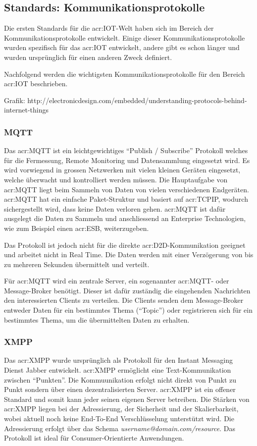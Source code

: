 \subsection{Standards: Kommunikationsprotokolle}
Die ersten Standards für die \gls{acr:IOT}-Welt haben sich im Bereich der Kommunikationsprotokolle entwickelt. Einige dieser Kommunikationsprotokolle wurden spezifisch für das \gls{acr:IOT} entwickelt, andere gibt es schon länger und wurden ursprünglich für einen anderen Zweck definiert.

Nachfolgend werden die wichtigsten Kommunikationsprotokolle für den Bereich \gls{acr:IOT} beschrieben.

Grafik: http://electronicdesign.com/embedded/understanding-protocols-behind-internet-things 


\subsubsection{MQTT}
Das \gls{acr:MQTT} ist ein leichtgewichtiges "`Publish / Subscribe"' Protokoll welches für die Fermessung, Remote Monitoring und Datensammlung eingesetzt wird. Es wird vorwiegend in grossen Netzwerken mit vielen kleinen Geräten eingesetzt, welche überwacht und kontrolliert werden müssen. Die Hauptaufgabe von \gls{acr:MQTT} liegt beim Sammeln von Daten von vielen verschiedenen Endgeräten. \gls{acr:MQTT} hat ein einfache Paket-Struktur und basiert auf \gls{acr:TCPIP}, wodurch sichergestellt wird, dass keine Daten verloren gehen. \gls{acr:MQTT} ist dafür ausgelegt die Daten zu Sammeln und anschliessend an Enterprise Technologien, wie zum Beispiel einen \gls{acr:ESB}, weiterzugeben.

Das Protokoll ist jedoch nicht für die direkte \gls{acr:D2D}-Kommunikation geeignet und arbeitet nicht in Real Time. Die Daten werden mit einer Verzögerung von bis zu mehreren Sekunden übermittelt und verteilt.

Für \gls{acr:MQTT} wird ein zentrale Server, ein sogenannter \gls{acr:MQTT}- oder Message-Broker benötigt. Dieser ist dafür zuständig die eingehenden Nachrichten den interessierten Clients zu verteilen. Die Clients senden dem Message-Broker entweder Daten für ein bestimmtes Thema ("`Topic"') oder registrieren sich für ein bestimmtes Thema, um die übermittelten Daten zu erhalten.



\subsubsection{XMPP}
Das \gls{acr:XMPP} wurde ursprünglich als Protokoll für den Instant Messaging Dienst Jabber entwickelt. \gls{acr:XMPP} ermöglicht eine Text-Kommunikation zwischen "`Punkten"'. Die Kommuunikation erfolgt nicht direkt von Punkt zu Punkt sondern über einen dezentralisierten Server. \gls{acr:XMPP} ist ein offener Standard und somit kann jeder seinen eigenen Server betreiben. Die Stärken von \gls{acr:XMPP} liegen bei der Adressierung, der Sicherheit und der Skalierbarkeit, wobei aktuell noch keine End-To-End Verschlüsselung unterstützt wird. Die Adressierung erfolgt über das Schema \textit{username@domain.com/resource}. Das Protokoll ist ideal für Consumer-Orientierte Anwendungen.

